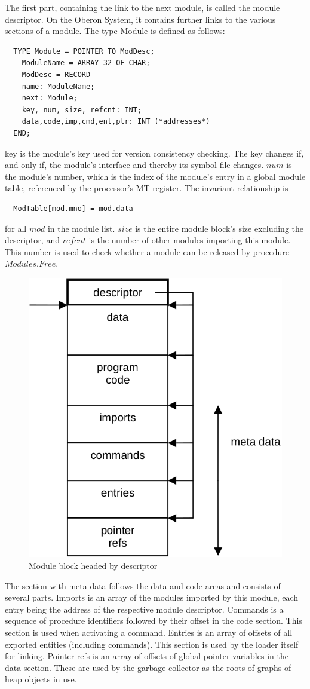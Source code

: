 The first part, containing the link to the next module, is called the module descriptor. On the Oberon
System, it contains further links to the various sections of a module. The type Module is defined as
follows:
\begin{verbatim}
  TYPE Module = POINTER TO ModDesc;
    ModuleName = ARRAY 32 OF CHAR;
    ModDesc = RECORD
    name: ModuleName;
    next: Module;
    key, num, size, refcnt: INT;
    data,code,imp,cmd,ent,ptr: INT (*addresses*)
  END;
\end{verbatim}

key is the module's key used for version consistency checking. The key changes if, and only if, the
module's interface and thereby its symbol file changes. $num$ is the module's number, which is the
index of the module's entry in a global module table, referenced by the processor's MT register. The
invariant relationship is
\begin{verbatim}
  ModTable[mod.mno] = mod.data
\end{verbatim}

for all $mod$ in the module list. $size$ is the entire module block's size excluding the descriptor, and $refcnt$
is the number of other modules importing this module. This number is used to check whether a
module can be released by procedure $Modules.Free$.
\begin{figure}
	\label{fig:module-block}
	\centering
	\includegraphics[width=.6\textwidth]{i/k}
	\caption{Module block headed by descriptor}
\end{figure}

The section with meta data follows the data and code areas and consists of several parts. Imports is
an array of the modules imported by this module, each entry being the address of the respective
module descriptor. Commands is a sequence of procedure identifiers followed by their offset in the
code section. This section is used when activating a command. Entries is an array of offsets of all
exported entities (including commands). This section is used by the loader itself for linking. Pointer
refs is an array of offsets of global pointer variables in the data section. These are used by the
garbage collector as the roots of graphs of heap objects in use.

